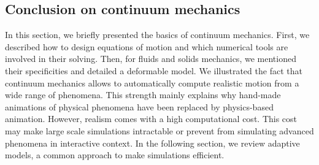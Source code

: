 \subsection{Conclusion on continuum mechanics}

In this section, we briefly presented the basics of continuum mechanics.
First, we described how to design equations of motion and which numerical tools are involved in their solving. 
Then, for fluids and solids mechanics, we mentioned their specificities and detailed a deformable model.
We illustrated the fact that continuum mechanics allows to automatically compute realistic motion from a wide range of phenomena.
This strength mainly explains why hand-made animations of physical phenomena have been replaced by physics-based animation.
However, realism comes with a high computational cost.
This cost may make large scale simulations intractable or prevent from simulating advanced phenomena in interactive context.
In the following section, we review adaptive models, a common approach to make simulations efficient.
